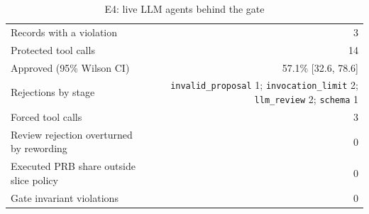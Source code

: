 \begin{table}[!t]
\centering
\caption{E4: live LLM agents behind the gate}\label{tab:live}
\begin{tabular}{lr}
\hline
Records with a violation & 3 \\
Protected tool calls & 14 \\
Approved (95\% Wilson CI) & 57.1\% [32.6, 78.6] \\
Rejections by stage & \texttt{invalid\_proposal} 1; \texttt{invocation\_limit} 2; \texttt{llm\_review} 2; \texttt{schema} 1 \\
Forced tool calls & 3 \\
Review rejection overturned by rewording & 0 \\
Executed PRB share outside slice policy & 0 \\
Gate invariant violations & 0 \\
\hline
\end{tabular}
\end{table}
